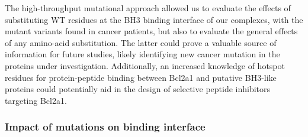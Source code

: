 \documentclass[10pt,letterpaper]{article}
\begin{document}
\smallskip

The high-throughput mutational approach allowed us to evaluate the effects of substituting WT residues at the BH3 binding interface of our complexes, with the mutant variants found in cancer patients, but also to evaluate the general effects of any amino-acid substitution. The latter could prove a valuable source of information for future studies, likely identifying new cancer mutation in the proteins under investigation. Additionally, an increased knowledge of hotspot residues for protein-peptide binding between Bcl2a1 and putative BH3-like proteins could potentially aid in the design of selective peptide inhibitors targeting Bcl2a1. 

\subsubsection*{Impact of mutations on binding interface}
\end{document}
